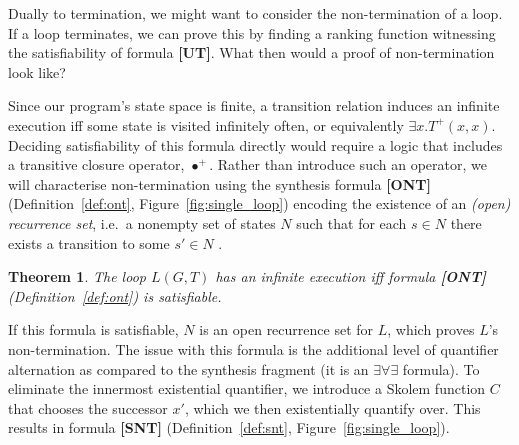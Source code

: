 \documentclass[preprint]{sigplanconf}
\newtheorem{theorem}{Theorem}
\theoremstyle{definition}
\begin{document}
Dually to termination, we might want to consider the non-termination of a loop.  If a loop terminates,
we can prove this by finding a ranking function %
witnessing the satisfiability of formula {\bf[UT]}.  What then would a proof of non-termination look like?

Since our program's state space is finite, a transition relation
induces an infinite execution iff some state is visited infinitely
often, or equivalently $ \exists x . T^+(x, x)$.
Deciding satisfiability of this formula directly would require a logic
that includes a transitive closure operator, $\bullet^+$.  Rather than
introduce such an operator, we will characterise non-termination
using the synthesis formula {\bf [ONT]} (Definition~\ref{def:ont}, Figure~\ref{fig:single_loop})
encoding the existence of an \emph{(open) recurrence set}, i.e.~a nonempty 
set of states $N$ such that for each $s \in N$ there
exists a transition to some $s' \in N$ \cite{DBLP:conf/popl/GuptaHMRX08}.

\begin{theorem}
\label{thm:ont}
 The loop $L(G, T)$ has an infinite execution iff formula {\bf [ONT]} (Definition~\ref{def:ont}) is satisfiable.
\end{theorem}

%  

If this formula is satisfiable, $N$ is an open recurrence set for $L$, which proves
$L$'s non-termination. The issue with this formula is the additional level of quantifier alternation as compared to the synthesis fragment
(it is an $\exists \forall \exists$ formula).  To eliminate the innermost existential quantifier,
we introduce a Skolem function $C$ that chooses the successor $x'$, which we then existentially quantify over.
This results in formula {\bf [SNT]} (Definition~\ref{def:snt}, Figure~\ref{fig:single_loop}).
\end{document}
